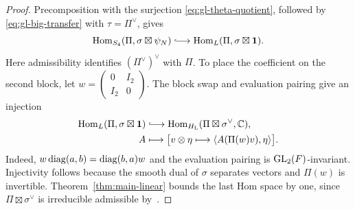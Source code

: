 \begin{proof}
Precomposition with the surjection \eqref{eq:gl-theta-quotient},
followed by \eqref{eq:gl-big-transfer} with $\tau=\Pi^\vee$, gives
\begin{equation}\label{eq:gl-precomposition}
 \Hom_{S_4}(\Pi,\sigma\boxtimes\psi_N)
 \lhook\joinrel\longrightarrow
 \Hom_L(\Pi,\sigma\boxtimes\mathbf1).
\end{equation}
Here admissibility identifies $(\Pi^\vee)^\vee$ with $\Pi$.
To place the coefficient on the second block, let
$w=\left(\begin{smallmatrix}0&I_2\\I_2&0\end{smallmatrix}\right)$.
The block swap and evaluation pairing give an injection
\[
 \begin{aligned}
 \Hom_L(\Pi,\sigma\boxtimes\mathbf1)
 &\lhook\joinrel\longrightarrow
 \Hom_{H_{\mathrm L}}(\Pi\boxtimes\sigma^\vee,\mathbb C),\\
 A&\longmapsto
 \bigl[v\otimes\eta\longmapsto
          \langle A(\Pi(w)v),\eta\rangle\bigr].
 \end{aligned}
\]
Indeed, $w\operatorname{diag}(a,b)=\operatorname{diag}(b,a)w$ and the evaluation pairing is
$\operatorname{GL}_2(F)$-invariant. Injectivity follows because the smooth dual
of $\sigma$ separates vectors and $\Pi(w)$ is invertible.
Theorem~\ref{thm:main-linear} bounds the last Hom space by one,
since $\Pi\boxtimes\sigma^\vee$ is irreducible admissible
by~\cite[Proposition~2.16]{BZ76}.
\end{proof}


